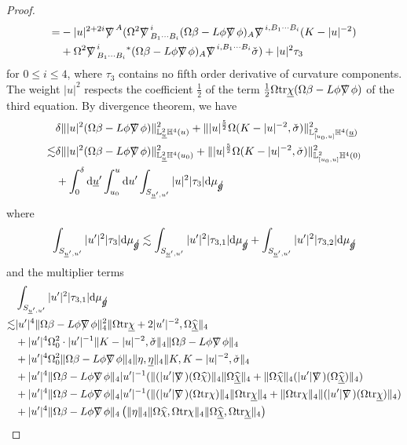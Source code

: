 \documentclass[11pt,reqno]{amsart}
\theoremstyle{definition}
\numberwithin{equation}{section}
\newcommand{\D}{\mathrm{d}}
\newcommand{\tr}{\mathrm{tr}}
\renewcommand{\L}{\mathbb{L}}
\renewcommand{\H}{\mathbb{H}}
\def\chib{\underline{\chi}}
\def\chibh{\widehat{\underline{\chi}}}
\def\chih{\widehat{\chi}}
\def\etab{\underline{\eta}}
\def\tr{\mathrm{tr}}
\def\sigmac{\check{\sigma}}
\def\ub{\underline{u}}
\def\nablas{\mbox{$\nabla \mkern -13mu /$ }}
\def\gs{\mbox{$g \mkern -9mu /$}}
\begin{document}
\begin{proof}
\begin{align*}
=&-|u|^{2+2i}\nablas^A(\Omega^2\nablas^i_{B_1\cdots B_i}(\Omega\beta-L\phi\nablas\phi)_A\nablas^{i,B_1\cdots B_i}(K-|u|^{-2})\\&+\Omega^2\nablas^i_{B_1\cdots B_i}{}^*(\Omega\beta-L\phi\nablas\phi)_A\nablas^{i,B_1\cdots B_i}\sigmac)+|u|^2\tau_{3}
\end{align*}
for $0\le i\le4$, where $\tau_3$ contains no fifth order derivative of curvature components. The weight $|u|^2$ respects the coefficient $\frac{1}{2}$ of the term $\frac{1}{2}\Omega\tr\chib(\Omega\beta-L\phi\nablas\phi)$ of the third equation. By divergence theorem, we have
\begin{align*}
&\delta\||u|^2(\Omega\beta-L\phi\nablas\phi)\|_{\L^2_{\ub}\H^4(u)}^2+\||u|^{\frac{5}{2}}\Omega(K-|u|^{-2},\check{\sigma})\|_{\L^2_{[u_0,u]}\H^4(\ub)}^2\\
\lesssim&\delta\||u|^2(\Omega\beta-L\phi\nablas\phi)\|_{\L^2_{\ub}\H^4(u_0)}^2+\||u|^{\frac{5}{2}}\Omega(K-|u|^{-2},\check{\sigma})\|_{\L^2_{[u_0,u]}\H^4(0)}^2\\
&+\int_0^{\delta}\D\ub'\int_{u_0}^u\D u'\int_{S_{\ub',u'}}|u|^2|\tau_3|\D\mu_{\gs}
\end{align*}
where
\begin{align*}
\int_{S_{\ub',u'}}|u'|^2|\tau_3|\D\mu_{\gs}\lesssim\int_{S_{\ub',u'}}|u'|^2|\tau_{3,1}|\D\mu_{\gs}+\int_{S_{\ub',u'}}|u'|^2|\tau_{3,2}|\D\mu_{\gs}
\end{align*}
and the multiplier terms
\begin{equation}\label{tau31}
\begin{split}
&\int_{S_{\ub',u'}}|u'|^2|\tau_{3,1}|\D\mu_{\gs}\\
\lesssim&|u'|^4\|\Omega\beta-L\phi\nablas\phi\|_4^2\|\Omega\tr\chib+2|u'|^{-2},\Omega\chibh\|_4\\
&+|u'|^4\Omega_0^2\cdot|u'|^{-1}\|K-|u|^{-2},\check{\sigma}\|_4\|\Omega\beta-L\phi\nablas\phi\|_4\\
&+|u'|^4\Omega_0^2\|\Omega\beta-L\phi\nablas\phi\|_4\|\eta,\etab\|_4\|K,K-|u|^{-2},\check{\sigma}\|_4\\
&+|u'|^4\|\Omega\beta-L\phi\nablas\phi\|_4|u'|^{-1}(\|(|u'|\nablas)(\Omega\chih)\|_4\|\Omega\chibh\|_4+\|\Omega\chih\|_4(|u'|\nablas)(\Omega\chibh)\|_4)\\
&+|u'|^4\|\Omega\beta-L\phi\nablas\phi\|_4|u'|^{-1}(\|(|u'|\nablas)(\Omega\tr\chi)\|_4\|\Omega\tr\chib\|_4+\|\Omega\tr\chi\|_4\|(|u'|\nablas)(\Omega\tr\chib)\|_4)\\
&+|u'|^4\|\Omega\beta-L\phi\nablas\phi\|_4\left(\|\eta\|_4\|\Omega\chih,\Omega\tr\chi\|_4\|\Omega\chibh,\Omega\tr\chib\|_4\right)\\

\end{split}
\end{equation}
\end{proof}
\end{document}
